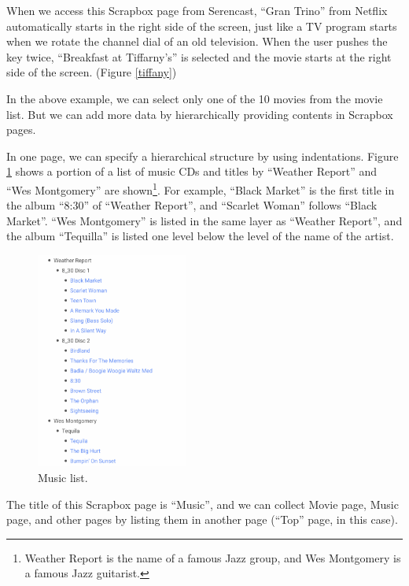 \documentclass[conference]{IEEEtran}
\def\down{\tsf{▼}}
\def\SC{Serencast}
\def\SB{Scrapbox}
\begin{document}
When we access this {\SB} page from {\SC},
``Gran Trino'' from Netflix automatically starts in the right side of the screen,
just like a TV program starts when we rotate the channel dial of an old television.
When the user pushes the {\down} key twice,
``Breakfast at Tiffarny's'' is selected and
the movie starts at the right side of the screen. (Figure \ref{tiffany})

In the above example, we can select only one of the 10 movies from the movie list.
But we can add more data by hierarchically providing contents in {\SB} pages.

In one page, we can specify a hierarchical structure by using indentations.
Figure \ref{musiclist} shows a portion of a list of music CDs and
titles by ``Weather Report'' and ``Wes Montgomery'' are shown\footnote{
  Weather Report is the name of a famous Jazz group, and Wes Montgomery is a famous Jazz guitarist.
}.
For example, 
``Black Market'' is the first title in the album ``8:30'' of ``Weather Report'', and
``Scarlet Woman'' follows ``Black Market''.
``Wes Montgomery'' is listed in the same layer as ``Weather Report'', and
the album ``Tequilla'' is listed one level below the level of the name of the artist.

\begin{figure}[H]
\centerline{\includegraphics[width=50mm,bb=0 0 652 926]{figures/d8fe8ff8f3e1bbcb34cf51e268592f8c.png}}
\caption{Music list.}
\label{musiclist}
\end{figure}

The title of this {\SB} page is ``Music'', and 
we can collect Movie page, Music page, and other pages by
listing them in another page (``Top'' page, in this case).
\end{document}
